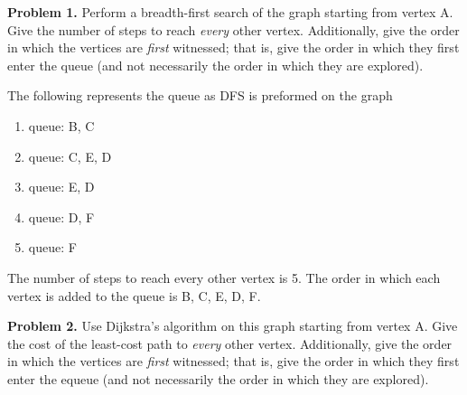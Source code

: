 \documentclass{article}
\begin{document}

\vspace*{5mm}\par\textbf{Problem 1.} Perform a breadth-first search of the graph starting from vertex A.  Give the number of steps to reach \emph{every} other vertex.  Additionally, give the order in which the vertices are \emph{first} witnessed; that is, give the order in which they first enter the queue (and not necessarily the order in which they are explored).\par

\bigskip
The following represents the queue as DFS is preformed on the graph
\begin{enumerate}
    \item queue: B, C
    \item queue: C, E, D
    \item queue: E, D
    \item queue: D, F
    \item queue: F
\end{enumerate}

The number of steps to reach every other vertex is 5. The order in which each vertex is added to the queue is 
B, C, E, D, F. 

\vspace*{10mm}\par\textbf{Problem 2.} Use Dijkstra's algorithm on this graph starting from vertex A.  Give the cost of the least-cost path to \emph{every} other vertex.  Additionally, give the order in which the vertices are \emph{first} witnessed; that is, give the order in which they first enter the equeue (and not necessarily the order in which they are explored).\par
\end{document}
